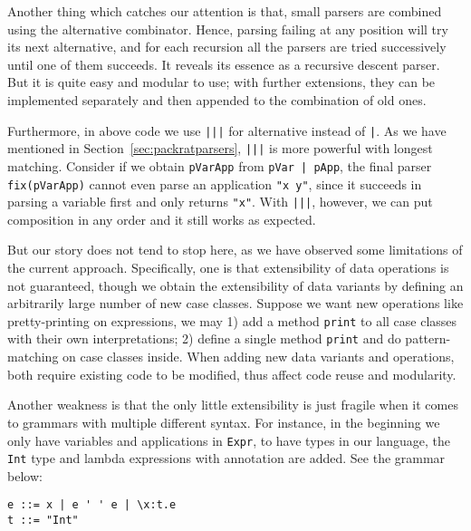 Another thing which catches our attention is that, small parsers are combined using the alternative combinator. Hence, parsing failing at any position will try its next alternative, and for each recursion all the parsers are tried successively until one of them succeeds. It reveals its essence as a recursive descent parser. But it is quite easy and modular to use; with further extensions, they can be implemented separately and then appended to the combination of old ones.

Furthermore, in above code we use \lstinline{|||} for alternative instead of \lstinline{|}. As we have mentioned in Section~\ref{sec:packratparsers}, \lstinline{|||} is more powerful with longest matching. Consider if we obtain \lstinline{pVarApp} from \lstinline{pVar | pApp}, the final parser \lstinline{fix(pVarApp)} cannot even parse an application \lstinline{"x y"}, since it succeeds in parsing a variable first and only returns \lstinline{"x"}. With \lstinline{|||}, however, we can put composition in any order and it still works as expected.

But our story does not tend to stop here, as we have observed some limitations of the current approach. Specifically, one is that extensibility of data operations is not guaranteed, though we obtain the extensibility of data variants by defining an arbitrarily large number of new case classes. Suppose we want new operations like pretty-printing on expressions, we may 1) add a method \lstinline{print} to all case classes with their own interpretations; 2) define a single method \lstinline{print} and do pattern-matching on case classes inside. When adding new data variants and operations, both require existing code to be modified, thus affect code reuse and modularity.

Another weakness is that the only little extensibility is just fragile when it comes to grammars with multiple different syntax. For instance, in the beginning we only have variables and applications in \lstinline{Expr}, to have types in our language, the \lstinline{Int} type and lambda expressions with annotation are added. See the grammar below:
\begin{lstlisting}
e ::= x | e ' ' e | \x:t.e
t ::= "Int"
\end{lstlisting}

